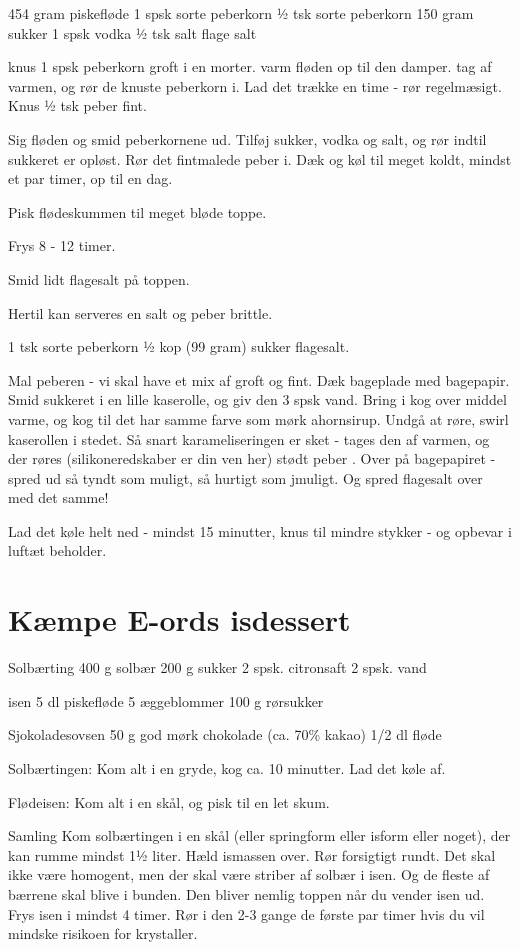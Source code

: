 \documentclass[
]{book}
\begin{document}
454 gram piskefløde
1 spsk sorte peberkorn
½ tsk sorte peberkorn
150 gram sukker
1 spsk vodka
½ tsk salt
flage salt

knus 1 spsk peberkorn groft i en morter.
varm fløden op til den damper. tag af varmen, og rør de
knuste peberkorn i. Lad det trække en time - rør regelmæsigt.
Knus ½ tsk peber fint.

Sig fløden og smid peberkornene ud. Tilføj sukker,
vodka og salt, og rør indtil sukkeret er opløst.
Rør det fintmalede peber i. Dæk og køl til meget
koldt, mindst et par timer, op til en dag.

Pisk flødeskummen til meget bløde toppe.

Frys 8 - 12 timer.

Smid lidt flagesalt på toppen.

Hertil kan serveres en salt og peber brittle.

1 tsk sorte peberkorn
½ kop (99 gram) sukker
flagesalt.

Mal peberen - vi skal have et mix af groft og fint.
Dæk bageplade med bagepapir.
Smid sukkeret i en lille kaserolle, og giv den 3
spsk vand. Bring i kog over middel varme,
og kog til det har samme farve som mørk ahornsirup.
Undgå at røre, swirl kaserollen i stedet.
Så snart karameliseringen er sket - tages den af varmen, og der røres (silikoneredskaber er din ven her) stødt peber . Over på bagepapiret - spred ud så tyndt som muligt, så hurtigt som jmuligt. Og spred
flagesalt over med det samme!

Lad det køle helt ned - mindst 15 minutter, knus til mindre stykker - og opbevar i luftæt beholder.

\section{Kæmpe E-ords isdessert}\label{kuxe6mpe-e-ords-isdessert}

Solbærting
400 g solbær
200 g sukker
2 spsk. citronsaft
2 spsk. vand

isen
5 dl piskefløde
5 æggeblommer
100 g rørsukker

Sjokoladesovsen
50 g god mørk chokolade (ca. 70\% kakao)
1/2 dl fløde

Solbærtingen:
Kom alt i en gryde, kog ca. 10 minutter. Lad det køle af.

Flødeisen:
Kom alt i en skål, og pisk til en let skum.

Samling
Kom solbærtingen i en skål (eller springform eller isform eller noget), der kan rumme
mindst 1½ liter. Hæld ismassen over. Rør forsigtigt rundt. Det skal ikke være
homogent, men der skal være striber af solbær i isen. Og de fleste af bærrene
skal blive i bunden. Den bliver nemlig toppen når du vender isen ud.
Frys isen i mindst 4 timer. Rør i den 2-3 gange de første par timer
hvis du vil mindske risikoen for krystaller.
\end{document}
